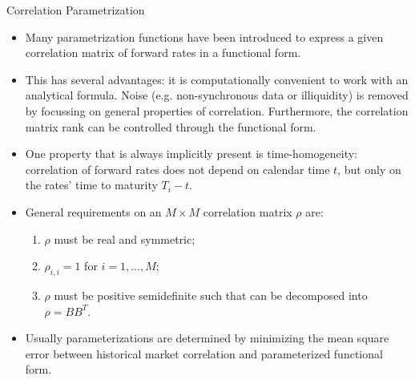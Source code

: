 \documentclass{beamer}
\begin{document}
\begin{frame}{Correlation Parametrization}
\begin{itemize}
\item Many parametrization functions have been introduced to express a given correlation matrix of forward rates in a functional form. 
\item This has several advantages: it is computationally convenient to work with an analytical formula. Noise (e.g. non-synchronous data or illiquidity) is removed by focussing on general properties of correlation. Furthermore, the correlation matrix rank can be controlled through the functional form.
\item One property that is always implicitly present is time-homogeneity: correlation of forward rates does not depend on calendar time $t$, but only on the rates’ time to maturity $T_i-t$.
\item  General requirements on an $M \times M$ correlation matrix $\rho$ are:
\begin{enumerate}
	\item $\rho$ must be real and symmetric;
	\item $\rho_{i,i}=1$ for $i = 1,\ldots, M$;
	\item $\rho$ must be positive semidefinite such that can be decomposed into $\rho = BB^T$.
\end{enumerate}
\item Usually parameterizations are determined by minimizing the mean square error between historical market correlation and parameterized functional form.
\end{itemize}
\end{frame}
\end{document}
